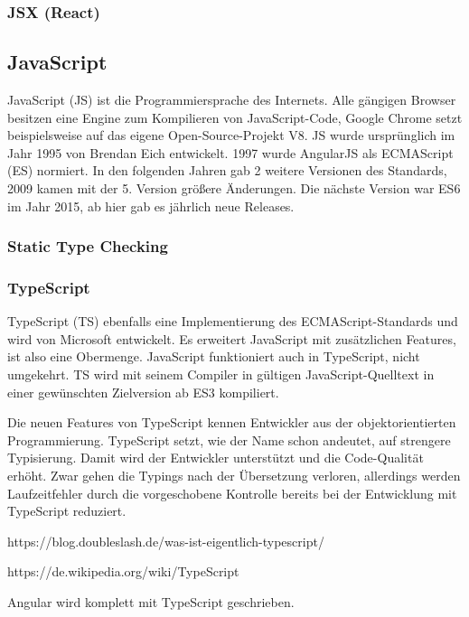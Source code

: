 \subsubsection{JSX (React)}


\subsection{JavaScript}
JavaScript (JS) ist die Programmiersprache des Internets. Alle gängigen Browser besitzen eine Engine zum Kompilieren von JavaScript-Code, Google Chrome setzt beispielsweise auf das eigene Open-Source-Projekt V8. JS wurde ursprünglich im Jahr 1995 von Brendan Eich entwickelt. 1997 wurde AngularJS als ECMAScript (ES) normiert. In den folgenden Jahren gab 2 weitere Versionen des Standards, 2009 kamen mit der 5. Version größere Änderungen. Die nächste Version war ES6 im Jahr 2015, ab hier gab es jährlich neue Releases.


\subsubsection{Static Type Checking}

\subsubsection{TypeScript}
TypeScript (TS) ebenfalls eine Implementierung des ECMAScript-Standards und wird von Microsoft entwickelt. Es erweitert JavaScript mit zusätzlichen Features, ist also eine Obermenge. JavaScript funktioniert auch in TypeScript, nicht umgekehrt. TS wird mit seinem Compiler in gültigen JavaScript-Quelltext in einer gewünschten Zielversion ab ES3 kompiliert.

Die neuen Features von TypeScript kennen Entwickler aus der objektorientierten Programmierung. TypeScript setzt, wie der Name schon andeutet, auf strengere Typisierung.
Damit wird der Entwickler unterstützt und die Code-Qualität erhöht. Zwar gehen die Typings nach der Übersetzung verloren, allerdings werden Laufzeitfehler durch die vorgeschobene Kontrolle bereits bei der Entwicklung mit TypeScript reduziert.

https://blog.doubleslash.de/was-ist-eigentlich-typescript/

https://de.wikipedia.org/wiki/TypeScript

Angular wird komplett mit TypeScript geschrieben.

